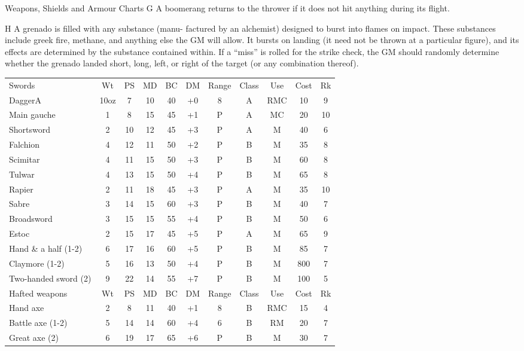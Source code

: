 \begin{Table}{Weapons, Shields and Armour Charts}
G A boomerang returns to the thrower if it does not 
hit anything during its flight. 

H  A  grenado  is  filled  with  any  substance  (manu-
factured  by  an  alchemist)  designed  to  burst  into 
flames  on  impact.  These  substances  include  greek 
fire, methane, and anything else the GM will allow. 
It  bursts  on  landing  (it  need  not  be  thrown  at  a 
particular figure), and its effects are determined by 
the substance contained within. If a “miss” is rolled 
for  the  strike  check,  the  GM  should  randomly 
determine  whether  the  grenado  landed  short,  long, 
left,  or  right  of  the  target  (or  any  combination 
thereof). 

\begin{tabularx}{\linewidth}{Xcccccccccc}
Swords			& Wt	& PS	& MD	& BC	& DM	& Range	& Class	& Use	& Cost	& Rk	\\
DaggerA			& 10oz	& 7	& 10	& 40	& +0 	& 8	& A	& RMC	& 10	& 9	\\
Main gauche		& 1	& 8	& 15	& 45	& +1	& P	& A	& MC	& 20	& 10	\\
Shortsword		& 2	& 10	& 12	& 45	& +3	& P	& A	& M	& 40	& 6	\\
Falchion		& 4	& 12	& 11	& 50	& +2	& P	& B	& M	& 35	& 8	\\
Scimitar		& 4	& 11	& 15	& 50	& +3	& P	& B	& M	& 60	& 8	\\
Tulwar			& 4	& 13	& 15	& 50	& +4	& P	& B	& M	& 65	& 8	\\
Rapier			& 2	& 11	& 18	& 45	& +3	& P	& A	& M	& 35	& 10	\\
Sabre			& 3	& 14	& 15	& 60	& +3	& P	& B	& M	& 40	& 7	\\
Broadsword		& 3	& 15	& 15	& 55	& +4	& P	& B	& M	& 50	& 6	\\
Estoc			& 2	& 15	& 17	& 45	& +5	& P	& A	& M	& 65	& 9	\\
Hand \& a half (1-2)	& 6	& 17	& 16	& 60	& +5	& P	& B	& M	& 85	& 7	\\
Claymore (1-2)		& 5	& 16	& 13	& 50	& +4	& P	& B	& M	& 800	& 7	\\
Two-handed sword (2)	& 9	& 22	& 14	& 55	& +7	& P	& B	& M	& 100	& 5	\\ 
Hafted weapons		& Wt	& PS	& MD	& BC	& DM	& Range	& Class	& Use	& Cost	& Rk	\\
Hand axe		& 2	& 8	& 11	& 40	& +1	& 8	& B	& RMC	& 15	& 4	\\
Battle axe (1-2)	& 5 	& 14	& 14	& 60	& +4	& 6	& B	& RM	& 20	& 7	\\
Great axe (2)		& 6	& 19	& 17	& 65	& +6	& P	& B	& M	& 30	& 7	\\

\end{tabularx}
\end{Table}
